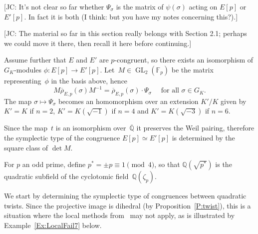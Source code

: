 \documentclass[12pt, reqno]{amsart}
\newcommand{\F}{\mathbb{F}}
\newcommand{\Q}{\mathbb{Q}}
\newcommand{\Qbar}{{\overline{\Q}}}
\newcommand{\rhobar}{{\overline{\rho}}}
\newcommand{\GL}{\operatorname{GL}}
\numberwithin{equation}{section}
\theoremstyle{definition}
\theoremstyle{remark}
\newcommand{\jc}[1]{{\color{darkgreen} \textsf{[JC: #1]}}}
\begin{document}
\jc{It's not clear so far whether $\Psi_\sigma$ is the matrix of
  $\psi(\sigma)$ acting on $E[p]$ or $E'[p]$.  In fact it is both (I
  think: but you have my notes concerning this?).}

\jc{The material so far in this section really belongs with Section
  2.1; perhaps we could move it there, then recall it here before
  continuing.}

Assume further that $E$ and $E'$ are $p$-congruent, so there exists an 
isomorphism of $G_K$-modules $\phi : E[p] \to E'[p]$. Let~$M \in \GL_2(\F_p)$ be the matrix representing~$\phi$ in the basis above, hence
\begin{equation}\label{E:PsiM}
M \rhobar_{E,p}(\sigma) M^{-1} = \rhobar_{E,p}(\sigma) \cdot \Psi_\sigma 
 \quad \text{ for all } \sigma \in G_K.
\end{equation}
The map $\sigma \mapsto \Psi_\sigma$ becomes an homomorphism over an extension $K'/K$ given by $K'=K$ if $n=2$, $K'=K(\sqrt{-1})$ if $n=4$ and $K'=K(\sqrt{-3})$ if $n=6$.


Since the map~$t$ is an isomorphism over~$\Qbar$ it preserves the Weil pairing, therefore the symplectic type of the congruence $E[p] \simeq E'[p]$ is determined by the square class of $\det M$.

For $p$ an odd prime, define $p^*=\pm p\equiv1\pmod4$, so that
$\Q(\sqrt{p^*})$ is the quadratic subfield of the cyclotomic
field~$\Q(\zeta_p)$. 

We start by determining the symplectic type of congruences between quadratic twists.
Since the projective
image is dihedral (by Proposition~\ref{P:twist}), this
is a situation where the local methods from~\cite{FKSym} may not
apply, as is illustrated by Example~\ref{Ex:LocalFail7} below.
\end{document}
